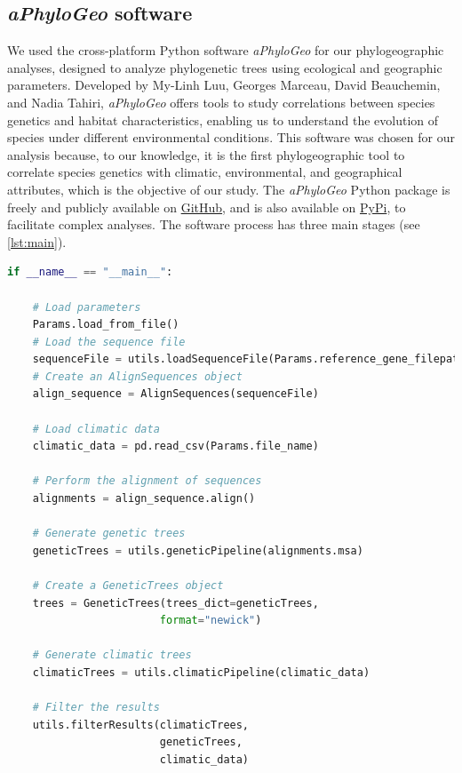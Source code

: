 \subsection{\textit{aPhyloGeo} software}\label{aPhyloGeo-software}

We used the cross-platform Python software \textit{aPhyloGeo} for our phylogeographic analyses, designed to analyze phylogenetic trees using ecological and geographic parameters. Developed by My-Linh Luu, Georges Marceau, David Beauchemin, and Nadia Tahiri, \textit{aPhyloGeo} offers tools to study correlations between species genetics and habitat characteristics, enabling us to understand the evolution of species under different environmental conditions. This software was chosen for our analysis because, to our knowledge, it is the first phylogeographic tool to correlate species genetics with climatic, environmental, and geographical attributes, which is the objective of our study. The \textit{aPhyloGeo} Python package is freely and publicly available on \href{https://github.com/tahiri-lab/aPhyloGeo}{GitHub}, and is also available on \href{https://pypi.org/project/aphylogeo/}{PyPi}, to facilitate complex analyses. The software process has three main stages (see \autoref{lst:main}).

\begin{lstlisting}[label=lst:main,language=Python,caption=Main script for tutorial using the aPhyloGeo package.]
if __name__ == "__main__":

    # Load parameters
    Params.load_from_file()
    # Load the sequence file
    sequenceFile = utils.loadSequenceFile(Params.reference_gene_filepath)
    # Create an AlignSequences object
    align_sequence = AlignSequences(sequenceFile)

    # Load climatic data 
    climatic_data = pd.read_csv(Params.file_name)

    # Perform the alignment of sequences
    alignments = align_sequence.align()

    # Generate genetic trees
    geneticTrees = utils.geneticPipeline(alignments.msa)
    
    # Create a GeneticTrees object
    trees = GeneticTrees(trees_dict=geneticTrees, 
                        format="newick")
   
    # Generate climatic trees
    climaticTrees = utils.climaticPipeline(climatic_data)
    
    # Filter the results
    utils.filterResults(climaticTrees, 
                        geneticTrees, 
                        climatic_data)

\end{lstlisting}

